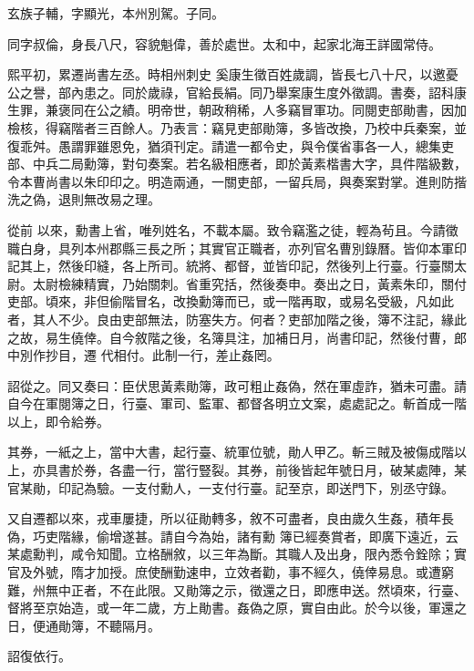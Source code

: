 \begin{pinyinscope}
 玄族子輔，字顯光，本州別駕。子同。



 同字叔倫，身長八尺，容貌魁偉，善於處世。太和中，起家北海王詳國常侍。



 熙平初，累遷尚書左丞。時相州刺史
 奚康生徵百姓歲調，皆長七八十尺，以邀憂公之譽，部內患之。同於歲祿，官給長絹。同乃舉案康生度外徵調。書奏，詔科康生罪，兼褒同在公之績。明帝世，朝政稍稀，人多竊冒軍功。同閱吏部勛書，因加檢核，得竊階者三百餘人。乃表言：竊見吏部勛簿，多皆改換，乃校中兵秦案，並復乖舛。愚謂罪雖恩免，猶須刊定。請遣一都令史，與令僕省事各一人，總集吏部、中兵二局勳簿，對句奏案。若名級相應者，即於黃素楷書大字，具件階級數，令本曹尚書以朱印印之。明造兩通，一關吏部，一留兵局，與奏案對掌。進則防揩洗之偽，退則無改易之理。



 從前
 以來，勳書上省，唯列姓名，不載本屬。致令竊濫之徒，輕為茍且。今請徵職白身，具列本州郡縣三長之所；其實官正職者，亦列官名曹別錄曆。皆仰本軍印記其上，然後印縫，各上所司。統將、都督，並皆印記，然後列上行臺。行臺關太尉。太尉檢練精實，乃始關刺。省重究括，然後奏申。奏出之日，黃素朱印，關付吏部。頃來，非但偷階冒名，改換勳簿而已，或一階再取，或易名受級，凡如此者，其人不少。良由吏部無法，防塞失方。何者？吏部加階之後，簿不注記，緣此之故，易生僥倖。自今敘階之後，名簿具注，加補日月，尚書印記，然後付曹，郎中別作抄目，遷
 代相付。此制一行，差止姦罔。



 詔從之。同又奏曰：臣伏思黃素勛簿，政可粗止姦偽，然在軍虛詐，猶未可盡。請自今在軍閱簿之日，行臺、軍司、監軍、都督各明立文案，處處記之。斬首成一階以上，即令給券。



 其券，一紙之上，當中大書，起行臺、統軍位號，勛人甲乙。斬三賊及被傷成階以上，亦具書於券，各盡一行，當行豎裂。其券，前後皆起年號日月，破某處陣，某官某勛，印記為驗。一支付勳人，一支付行臺。記至京，即送門下，別丞守錄。



 又自遷都以來，戎車屢捷，所以征勛轉多，敘不可盡者，良由歲久生姦，積年長偽，巧吏階緣，偷增遂甚。請自今為始，諸有勳
 簿已經奏賞者，即廣下遠近，云某處勳判，咸令知聞。立格酬敘，以三年為斷。其職人及出身，限內悉令銓除；實官及外號，隋才加授。庶使酬勤速申，立效者勸，事不經久，僥倖易息。或遭窮難，州無中正者，不在此限。又勛簿之示，徵還之日，即應申送。然頃來，行臺、督將至京始造，或一年二歲，方上勛書。姦偽之原，實自由此。於今以後，軍還之日，便通勛簿，不聽隔月。



 詔復依行。




\end{pinyinscope}
